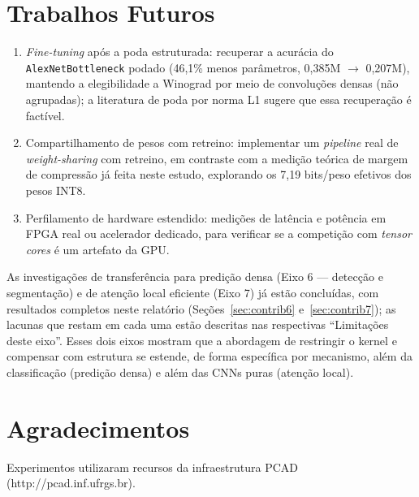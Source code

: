 \documentclass[conference]{IEEEtran}
\begin{document}
\section{Trabalhos Futuros}

\begin{enumerate}
\item \textit{Fine-tuning} após a poda estruturada: recuperar a acurácia do \texttt{AlexNetBottleneck}
podado (46,1\% menos parâmetros, 0,385M $\to$ 0,207M), mantendo a elegibilidade a Winograd por meio
de convoluções densas (não agrupadas); a literatura de poda por norma L1 \cite{li2017pruning}
sugere que essa recuperação é factível.
\item Compartilhamento de pesos com retreino: implementar um \textit{pipeline} real de
\textit{weight-sharing} \cite{han2016deepcompression} com retreino, em contraste com a medição
teórica de margem de compressão já feita neste estudo, explorando os 7,19 bits/peso efetivos dos
pesos INT8.
\item Perfilamento de hardware estendido: medições de latência e potência em FPGA real ou
acelerador dedicado, para verificar se a competição com \textit{tensor cores} é um artefato da GPU.
\end{enumerate}

\begin{sloppypar}
As investigações de transferência para predição densa (Eixo 6 — detecção e segmentação) e de
atenção local eficiente (Eixo 7) já estão concluídas, com resultados completos neste relatório
(Seções~\ref{sec:contrib6} e~\ref{sec:contrib7}); as lacunas que restam em cada uma estão
descritas nas respectivas ``Limitações deste eixo''. Esses dois eixos mostram que a abordagem de
restringir o kernel e compensar com estrutura se estende, de forma específica por mecanismo, além
da classificação (predição densa) e além das CNNs puras (atenção local).
\end{sloppypar}

\section*{Agradecimentos}
Experimentos utilizaram recursos da infraestrutura PCAD (http://pcad.inf.ufrgs.br).
\end{document}
